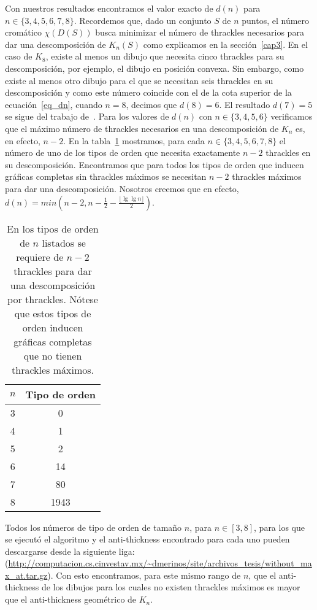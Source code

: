   Con nuestros resultados encontramos el valor exacto de $d(n)$ para
  $n\in\{3,4,5,6,7,8\}$. Recordemos que, dado un conjunto $S$ de $n$ puntos, el número cromático
  $\chi(D(S))$ busca minimizar el número de thrackles necesarios para dar una descomposición de $K_n(S)$
  como explicamos en la sección~\ref{cap3}. En el caso de $K_8$, existe al menos un dibujo que necesita
  cinco thrackles para su descomposición, por ejemplo, el dibujo en posición convexa. Sin embargo, como
  existe al menos otro dibujo para el que se necesitan seis thrackles en su descomposición y como este
  número coincide con el de la cota superior de la ecuación~\ref{eq_dn}, cuando $n=8$, decimos que $d(8)=6$.
  El resultado $d(7)=5$ se sigue del trabajo  de~\cite{Araujo2005}. Para los valores de $d(n)$ con $n \in
  \{3,4,5,6\}$ verificamos que el máximo número de thrackles necesarios en una descomposición de $K_n$ es,
  en efecto, $n-2$. En la tabla~\ref{tabla_ds} mostramos, para cada $n \in \{3,4,5,6,7,8\}$ el número de uno
  de los tipos de orden que necesita exactamente $n-2$ thrackles en su descomposición. Encontramos que para
  todos los tipos de orden que inducen gráficas completas sin thrackles máximos se necesitan $n-2$
  thrackles máximos para dar una descomposición. Nosotros creemos que en efecto,
  $d(n)=min\left(n-2,n-\frac{1}{2}-\frac{\lfloor \lg \lg n\rfloor}{2}\right)$.
  \begin{table}
    \centering
    \begin{tabular}{|c|c|}
      \hline
      $n$ & Tipo de orden \\ \hline
      3   & 0 \\ \hline
      4   & 1 \\ \hline
      5   & 2 \\ \hline
      6   & 14 \\ \hline
      7   & 80 \\ \hline
      8   & 1943 \\ \hline
    \end{tabular}
    \caption{En los tipos de orden de $n$ listados se requiere de $n-2$ thrackles para dar una
    descomposición por thrackles. Nótese que estos tipos de orden inducen gráficas completas que no tienen
    thrackles máximos.}
    \label{tabla_ds}
  \end{table}

  Todos los números de tipo de orden de tamaño $n$, para $n \in [3,8]$, para los que se ejecutó el
  algoritmo y el anti-thickness encontrado para cada uno pueden descargarse desde la siguiente liga:
  (\url{http://computacion.cs.cinvestav.mx/~dmerinos/site/archivos_tesis/without_max_at.tar.gz}). Con esto
  encontramos, para este mismo rango de $n$, que el anti-thickness de los dibujos para los cuales no
  existen thrackles máximos es mayor que el anti-thickness geométrico de $K_n$.

